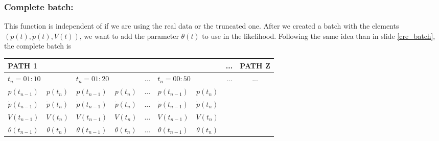 \documentclass[aspectratio=169]{beamer}\usepackage[utf8]{inputenc}
\begin{document}
\begin{frame}\frametitle{Complete batch:}
{\footnotesize
\alert{This function is independent of if we are using the real data or the truncated one.} After we created a batch with the elements $(p(t),\dot{p}(t),V(t))$, we want to add the parameter $\theta(t)$ to use in the likelihood. Following the same idea than in slide {\color{blue}\ref{cre_batch}}, the complete batch is
\begin{table}[]
\begin{tabular}{|c|c|c|c|c|c|c|c|c|}
\hline
\multicolumn{7}{|l|}{PATH 1}                                                                                       & ...                  & PATH Z               \\ \hline
\multicolumn{2}{|l|}{$t_n=01:10$}   & \multicolumn{2}{l|}{$t_n=01:20$}    & ... & \multicolumn{2}{l|}{$t_n=00:50$} & \multirow{4}{*}{...} & \multirow{4}{*}{...} \\ \cline{1-7}
$p(t_{n-1})$      & $p(t_{n})$      & $p(t_{n-1})$      & $p(t_{n})$      & ... & $p(t_{n-1})$     & $p(t_{n})$    &                      &                      \\ \cline{1-7}
$\dot{p}(t_{n-1})$ & $\dot{p}(t_{n})$ & $\dot{p}(t_{n-1})$ & $\dot{p}(t_{n})$ & ... & $\dot{p}(t_{n-1})$     & $\dot{p}(t_{n})$    &                      &                      \\ \cline{1-7}

$V(t_{n-1})$      & $V(t_{n})$      & $V(t_{n-1})$      & $V(t_{n})$      & ... & $V(t_{n-1})$     & $V(t_{n})$    &                      &                      \\ \hline
$\theta(t_{n-1})$      & $\theta(t_{n})$      & $\theta(t_{n-1})$      & $\theta(t_{n})$      & ... & $\theta(t_{n-1})$     & $\theta(t_{n})$    &                      &                      \\ \hline

\end{tabular}
\end{table}
\begin{center}
\begin{tabular}{|c|}
\toprule
{\tiny

}\\
\bottomrule
\end{tabular}
\end{center}}

\end{frame}
\end{document}
